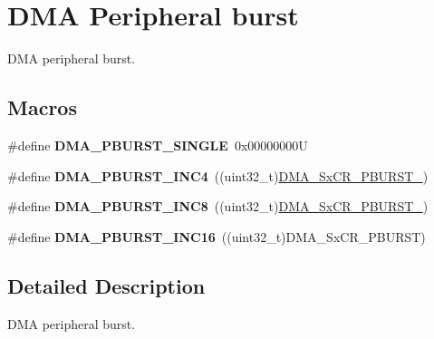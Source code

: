 \hypertarget{group___d_m_a___peripheral__burst}{}\section{D\+MA Peripheral burst}
\label{group___d_m_a___peripheral__burst}


D\+MA peripheral burst.  


\subsection*{Macros}
\begin{DoxyCompactItemize}
\item 
\mbox{\label{group___d_m_a___peripheral__burst_ga1ee9cf4dc1c8bfc5ab6dfb95a00f81ff}} 
\#define {\bfseries D\+M\+A\+\_\+\+P\+B\+U\+R\+S\+T\+\_\+\+S\+I\+N\+G\+LE}~0x00000000U
\item 
\mbox{\label{group___d_m_a___peripheral__burst_gacc54efc746528ed9e0173dad956f7caf}} 
\#define {\bfseries D\+M\+A\+\_\+\+P\+B\+U\+R\+S\+T\+\_\+\+I\+N\+C4}~((uint32\+\_\+t)\mbox{\hyperlink{group___peripheral___registers___bits___definition_gadf0eee1ad1788868a194f95107057a16}{D\+M\+A\+\_\+\+Sx\+C\+R\+\_\+\+P\+B\+U\+R\+S\+T\+\_}})
\item 
\mbox{\label{group___d_m_a___peripheral__burst_gaf76dd9b208c8606e8c5ae7abf8c26532}} 
\#define {\bfseries D\+M\+A\+\_\+\+P\+B\+U\+R\+S\+T\+\_\+\+I\+N\+C8}~((uint32\+\_\+t)\mbox{\hyperlink{group___peripheral___registers___bits___definition_ga061207b2c654a0dd62e40187c9557eda}{D\+M\+A\+\_\+\+Sx\+C\+R\+\_\+\+P\+B\+U\+R\+S\+T\+\_}})
\item 
\mbox{\label{group___d_m_a___peripheral__burst_ga705a631ea96b34aa5afa7fed06a487e0}} 
\#define {\bfseries D\+M\+A\+\_\+\+P\+B\+U\+R\+S\+T\+\_\+\+I\+N\+C16}~((uint32\+\_\+t)D\+M\+A\+\_\+\+Sx\+C\+R\+\_\+\+P\+B\+U\+R\+ST)
\end{DoxyCompactItemize}


\subsection{Detailed Description}
D\+MA peripheral burst. 


